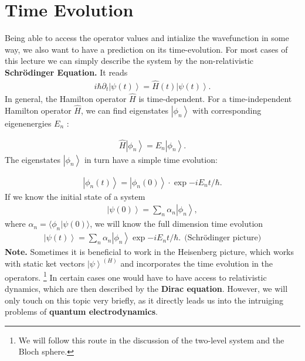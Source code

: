 \documentclass[10pt]{article}
\newcommand{\ket}[1]{\ensuremath{\left|#1\right\rangle}}
\begin{document}
\section{Time Evolution}
Being able to access the operator values and intialize the wavefunction in some way, we also want to have a prediction on its time-evolution. For most cases of this lecture we can simply describe the system by the non-relativistic \textbf{Schrödinger Equation.} It reads
\begin{align}
i\hbar\partial_t\ket{\psi(t)}=\hat{H}(t)\ket{\psi(t)}.
\end{align}
In general, the Hamilton operator $\hat{H}$ is time-dependent. For a time-independent Hamilton operator $\hat{H}$, we can find eigenstates $\ket{\phi_n}$ with corresponding eigenenergies $E_n$ :

\begin{align}
\hat{H}\ket{\phi_n}=E_n\ket{\phi_n}.
\end{align}
The eigenstates $\ket{\phi_n}$ in turn have a simple time evolution:

\begin{align}
    \ket{\phi_n(t)}=\ket{\phi_n(0)}\cdot \exp{-i E_nt/\hbar}.
\end{align}
If we know the initial state of a system
\begin{align}
\ket{\psi(0)}=\sum_n \alpha_n\ket{\phi_n},
\end{align}
where $\alpha_n=\langle\phi_n | \psi(0)\rangle$, we will know the full dimension time evolution
\begin{align}
\ket{\psi(t)}=\sum_n\alpha_n\ket{\phi_n}\exp{-i E_n t/\hbar}. \;\, \text{(Schrödinger picture)}
\end{align}
\textbf{Note.} Sometimes it is beneficial to work in the Heisenberg picture, which works with static ket vectors $\ket{\psi}^{(H)}$ and incorporates the time evolution in the operators. \footnote{We will follow this route in the discussion of the two-level system and the Bloch sphere.}
In certain cases one would have to have access to relativistic dynamics, which are then described by the \textbf{Dirac equation}. However, we will only touch on this topic very briefly, as it directly leads us into the intruiging problems of \textbf{quantum electrodynamics}.
\end{document}
